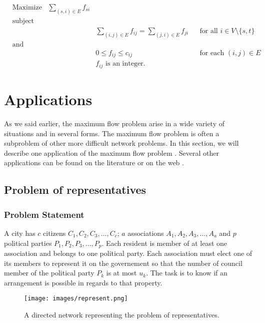 \begin{equation}
\begin{aligned}
& {\text{Maximize}} & \sum\limits_{(s,i) \in E} f_{si} & & &\\
& \text{subject to} & & & &\\
& & & \sum\limits_{(i,j)\in E} f_{ij} = \sum\limits_{(j,i)\in E} f_{ji} & & \text{for all } i \in V \setminus \{s, t\}\\
& \text{and} & & & & \\
& & & 0 \leq f_{ij} \leq c_{ij} & & \text{for each } (i, j) \in E\\
& & & f_{ij} \text{ is an integer.}& &
\end{aligned}
\end{equation}

\section{Applications}
\label{sec:applications}
As we said earlier, the maximum flow problem arise in a wide variety of situations and in several forms. The maximum flow problem is often a subproblem of other more difficult network problems. In this section, we will describe one application of the maximum flow problem \cite{networkflows}. Several other applications can be found on the literature or on the web \cite{lectuApps}.

\subsection{Problem of representatives}

\subsubsection{Problem Statement}

A city has $c$ citizens $C_1, C_2, C_3, ..., C_c$; $a$ associations $A_1, A_2, A_3, ..., A_a$ and $p$ political parties $P_1, P_2, P_3, ..., P_p$. Each resident is member of at least one association and belongs to one political party. Each association  must elect one of its members to represent it on the governement so that the number of council member of the political party $P_k$ is at most $u_k$. The task is to know if an arrangement is possible in regards to that property.

\begin{figure}[h]
\centering
\texttt{[image: images/represent.png]}
\caption{A directed network representing the problem of representatives.}
\label{img:represent}
\end{figure}

